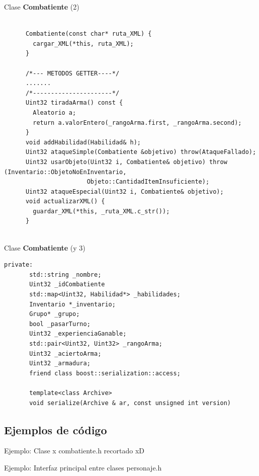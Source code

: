 \documentclass[9pt,xcolor=svgnames]{beamer}
\begin{document}
  \begin{frame}[fragile=singleslide]{Clase \textbf{Combatiente} (2)}
   \begin{lstlisting}[style=C++]
                  
      Combatiente(const char* ruta_XML) {
        cargar_XML(*this, ruta_XML);
      }

      /*--- METODOS GETTER----*/
      .......
      /*----------------------*/
      Uint32 tiradaArma() const {
        Aleatorio a;
        return a.valorEntero(_rangoArma.first, _rangoArma.second);
      }
      void addHabilidad(Habilidad& h);
      Uint32 ataqueSimple(Combatiente &objetivo) throw(AtaqueFallado);
      Uint32 usarObjeto(Uint32 i, Combatiente& objetivo) throw (Inventario::ObjetoNoEnInventario,
                       Objeto::CantidadItemInsuficiente);
      Uint32 ataqueEspecial(Uint32 i, Combatiente& objetivo);
      void actualizarXML() {
        guardar_XML(*this, _ruta_XML.c_str());
      }
   
   \end{lstlisting}
   
  \end{frame}
  \begin{frame}[fragile=singleslide]{Clase \textbf{Combatiente} (y 3)}
   \begin{lstlisting}[style=C++]
     private:
       std::string _nombre;
       Uint32 _idCombatiente
       std::map<Uint32, Habilidad*> _habilidades;
       Inventario *_inventario;
       Grupo* _grupo;
       bool _pasarTurno;
       Uint32 _experienciaGanable;
       std::pair<Uint32, Uint32> _rangoArma;
       Uint32 _aciertoArma;
       Uint32 _armadura;
       friend class boost::serialization::access;

       template<class Archive>
       void serialize(Archive & ar, const unsigned int version)
   \end{lstlisting}
 \end{frame}
 
  \subsection{Ejemplos de código}
  
  \begin{frame}{Ejemplo: Clase x}
   combatiente.h recortado xD
  \end{frame}
  
  
  \begin{frame}{Ejemplo: Interfaz principal entre clases}
   personaje.h
  \end{frame}
    
\end{document}
